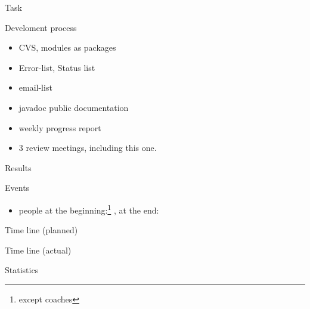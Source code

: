 

\begin{myslide}{Task}
  
\end{myslide}


\begin{myslide}{Develoment process}
  \begin{itemize}
  \item CVS, modules as packages
  \item Error-list, Status list
  \item email-list
  \item javadoc public documentation
  \item weekly progress report
  \item 3 review meetings, including this one. 
  \end{itemize}
  
\end{myslide}

\begin{myslide}{Results}
  
\end{myslide}



\begin{myslide}{Events}
  \begin{itemize}
  \item people at the beginning:\footnote{except coaches} ,
    at the end: 
  \end{itemize}
\end{myslide}

\begin{myslide}{Time line (planned)}

\end{myslide}
\begin{myslide}{Time line  (actual)}
  
\end{myslide}

\begin{myslide}{Statistics}
  
\end{myslide}




